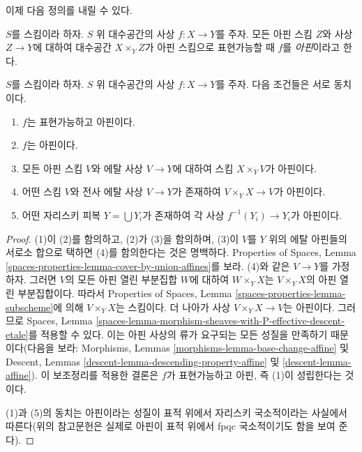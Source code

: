 \noindent
이제 다음 정의를 내릴 수 있다.

\begin{definition}
\label{definition-affine}
$S$를 스킴이라 하자.
$S$ 위 대수공간의 사상 $f : X \to Y$를 주자.
모든 아핀 스킴 $Z$와 사상 $Z \to Y$에 대하여 대수공간
$X \times_Y Z$가 아핀 스킴으로 표현가능할 때 $f$를
{\it 아핀}이라고 한다.
\end{definition}

\begin{lemma}
\label{lemma-affine-local}
$S$를 스킴이라 하자.
$S$ 위 대수공간의 사상 $f : X \to Y$를 주자.
다음 조건들은 서로 동치이다.
\begin{enumerate}
\item $f$는 표현가능하고 아핀이다.
\item $f$는 아핀이다.
\item 모든 아핀 스킴 $V$와 에탈 사상 $V \to Y$에 대하여
스킴 $X \times_Y V$가 아핀이다.
\item 어떤 스킴 $V$와 전사 에탈 사상
$V \to Y$가 존재하여 $V \times_Y X \to V$가 아핀이다.
\item 어떤 자리스키 피복 $Y = \bigcup Y_i$가 존재하여
각 사상 $f^{-1}(Y_i) \to Y_i$가 아핀이다.
\end{enumerate}
\end{lemma}

\begin{proof}
(1)이 (2)를 함의하고, (2)가 (3)을 함의하며, (3)이
$V$를 $Y$ 위의 에탈 아핀들의 서로소 합으로 택하면 (4)를
함의한다는 것은 명백하다. Properties of Spaces,
Lemma \ref{spaces-properties-lemma-cover-by-union-affines}를 보라.
(4)와 같은 $V \to Y$를 가정하자. 그러면 $V$의 모든 아핀 열린
부분집합 $W$에 대하여 $W \times_Y X$는
$V \times_Y X$의 아핀 열린 부분집합이다. 따라서
Properties of Spaces, Lemma
\ref{spaces-properties-lemma-subscheme}에 의해
$V \times_Y X$는 스킴이다. 더 나아가 사상
$V \times_Y X \to V$는 아핀이다. 그러므로
Spaces, Lemma
\ref{spaces-lemma-morphism-sheaves-with-P-effective-descent-etale}를
적용할 수 있다. 이는 아핀 사상의 류가 요구되는 모든 성질을
만족하기 때문이다(다음을 보라:
Morphisms, Lemmas \ref{morphisms-lemma-base-change-affine} 및
Descent, Lemmas \ref{descent-lemma-descending-property-affine}
및 \ref{descent-lemma-affine}). 이 보조정리를 적용한 결론은
$f$가 표현가능하고 아핀, 즉 (1)이 성립한다는 것이다.

\medskip\noindent
(1)과 (5)의 동치는 아핀이라는 성질이 표적 위에서 자리스키 국소적이라는
사실에서 따른다(위의 참고문헌은 실제로 아핀이 표적 위에서
fpqc 국소적이기도 함을 보여 준다).
\end{proof}

